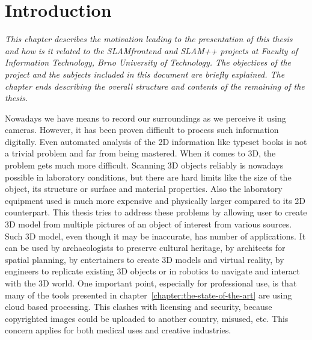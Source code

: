 \makeatletter
\renewcommand*\env@matrix[1][*\c@MaxMatrixCols c]{%
  \hskip -\arraycolsep
  \let\@ifnextchar\new@ifnextchar
  \array{#1}}
\makeatother

\chapter{Introduction}
\label{chapter:introduction}
\textit{This chapter describes the motivation leading to the presentation of this thesis and how is it related to the SLAM\textunderscore frontend and SLAM++ projects at Faculty of Information Technology, Brno University of Technology. The objectives of the project and the subjects included in this document are briefly explained. The chapter ends describing the overall structure and contents of the remaining of the thesis.}

\vspace{.5cm}
Nowadays we have means to record our surroundings as we perceive it using cameras. However, it has been proven difficult to process such information digitally. Even automated analysis of the 2D information like typeset books is not a trivial problem and far from being mastered. When it comes to 3D, the problem gets much more difficult. Scanning 3D objects reliably is nowadays possible in laboratory conditions, but there are hard limits like the size of the object, its structure or surface and material properties. Also the laboratory equipment used is much more expensive and physically larger compared to its 2D counterpart. This thesis tries to address these problems by allowing user to create 3D model from multiple pictures of an object of interest from various sources. Such 3D model, even though it may be inaccurate, has number of applications. It can be used by archaeologists to preserve cultural heritage, by architects for spatial planning, by entertainers to create 3D models and virtual reality, by engineers to replicate existing 3D objects or in robotics to navigate and interact with the 3D world. One important point, especially for professional use, is that many of the tools presented in chapter~\ref{chapter:the-state-of-the-art} are using cloud based processing. This clashes with licensing and security, because copyrighted images could be uploaded to another country, misused, etc. This concern applies for both medical uses and creative industries.

